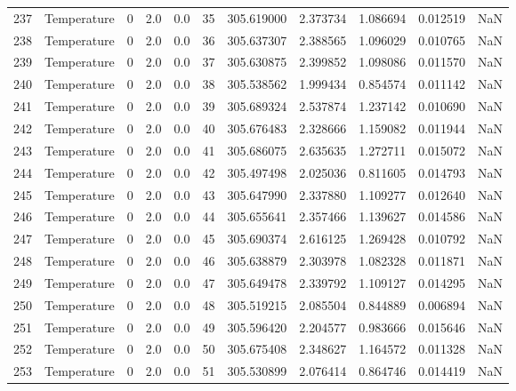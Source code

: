\begin{tabular}{llrrrrrrrrr}
237 &  Temperature &       0 &  2.0 &  0.0 &   35 &  305.619000 &  2.373734 &  1.086694 &   0.012519 &      NaN \\
238 &  Temperature &       0 &  2.0 &  0.0 &   36 &  305.637307 &  2.388565 &  1.096029 &   0.010765 &      NaN \\
239 &  Temperature &       0 &  2.0 &  0.0 &   37 &  305.630875 &  2.399852 &  1.098086 &   0.011570 &      NaN \\
240 &  Temperature &       0 &  2.0 &  0.0 &   38 &  305.538562 &  1.999434 &  0.854574 &   0.011142 &      NaN \\
241 &  Temperature &       0 &  2.0 &  0.0 &   39 &  305.689324 &  2.537874 &  1.237142 &   0.010690 &      NaN \\
242 &  Temperature &       0 &  2.0 &  0.0 &   40 &  305.676483 &  2.328666 &  1.159082 &   0.011944 &      NaN \\
243 &  Temperature &       0 &  2.0 &  0.0 &   41 &  305.686075 &  2.635635 &  1.272711 &   0.015072 &      NaN \\
244 &  Temperature &       0 &  2.0 &  0.0 &   42 &  305.497498 &  2.025036 &  0.811605 &   0.014793 &      NaN \\
245 &  Temperature &       0 &  2.0 &  0.0 &   43 &  305.647990 &  2.337880 &  1.109277 &   0.012640 &      NaN \\
246 &  Temperature &       0 &  2.0 &  0.0 &   44 &  305.655641 &  2.357466 &  1.139627 &   0.014586 &      NaN \\
247 &  Temperature &       0 &  2.0 &  0.0 &   45 &  305.690374 &  2.616125 &  1.269428 &   0.010792 &      NaN \\
248 &  Temperature &       0 &  2.0 &  0.0 &   46 &  305.638879 &  2.303978 &  1.082328 &   0.011871 &      NaN \\
249 &  Temperature &       0 &  2.0 &  0.0 &   47 &  305.649478 &  2.339792 &  1.109127 &   0.014295 &      NaN \\
250 &  Temperature &       0 &  2.0 &  0.0 &   48 &  305.519215 &  2.085504 &  0.844889 &   0.006894 &      NaN \\
251 &  Temperature &       0 &  2.0 &  0.0 &   49 &  305.596420 &  2.204577 &  0.983666 &   0.015646 &      NaN \\
252 &  Temperature &       0 &  2.0 &  0.0 &   50 &  305.675408 &  2.348627 &  1.164572 &   0.011328 &      NaN \\
253 &  Temperature &       0 &  2.0 &  0.0 &   51 &  305.530899 &  2.076414 &  0.864746 &   0.014419 &      NaN \\

\end{tabular}
